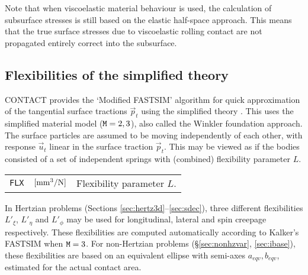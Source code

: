 \documentclass[12pt]{report}
\renewcommand{\magenta}[1]{}
\newenvironment{inputvars}{\vspace{0.4\baselineskip}%

\begin{tabular}{>{\raggedright}p{22mm}p{19mm}p{113mm}}}{
\end{tabular}

}
\newcommand{\inpvar}[3]{{\small\tt #1} & $#2$ & #3 \\[1ex]}
\begin{document}
Note that when viscoelastic material behaviour is used, the calculation of
subsurface stresses is still based on the elastic half-space approach. This
means that the true surface stresses due to viscoelastic rolling contact
are not propagated entirely correct into the subsurface.

\magenta{
\subsection{\texorpdfstring{\magenta{Compressible elastic layer}}{Compressible elastic layer}}
\label{sec:thin_sheet}

A quick fix is made to capture the effect of a sheet of pressure sensitive
paper, using the normal part of Kalker's first order theory \cite[\S
3.2]{Kalker1990}:
\begin{equation}
     u_z^{(3)} = L_z p_n, \;\; 
     L_z = h^{(3)} \frac{(1+\nu^{(3)}) (1-2\nu^{(3)})}{(1-\nu^{(3)}) E^{(3)}} .
\end{equation} 
\begin{inputvars}
\inpvar{FLXZ}{\bunit{mm^3/N}}{Flexibility parameter $L_z$.}
\end{inputvars}
This option is activated with ${\tt B}=1$ (page \pageref{b-digit}).
}

\subsection{Flexibilities of the simplified theory}
\label{sec:fastsim}

CONTACT provides the `Modified FASTSIM' algorithm \cite{Spiryagin2013} for
quick approximation of the tangential surface tractions $\vec{p}_t$ using
the simplified theory \cite{Kalker1973,Kalker1982a-fastsim}. This uses the
simplified material model (${\tt M}=2,3$), also called the Winkler
foundation approach. The surface particles are assumed to be moving
independently of each other, with response $\vec{u}_t$ linear in the
surface traction $\vec{p}_t$. This may be viewed as if the bodies
consisted of a set of independent springs with (combined) flexibility
parameter $L$.
\begin{inputvars}
\inpvar{FLX}{\bunit{mm^3/N}}{Flexibility parameter $L$.}
\end{inputvars}
In Hertzian problems (Sections \ref{sec:hertz3d}--\ref{sec:sdec}),
three different flexibilities $L'_\xi$, $L'_\eta$ and $L'_\phi$ may be
used for longitudinal, lateral and spin creepage respectively. These
flexibilities are computed automatically according to Kalker's
FASTSIM when ${\tt M}=3$. For non-Hertzian problems (\S \ref{sec:nonhzvar}, 
\ref{sec:ibase}), these flexibilities are based on an equivalent ellipse
with semi-axes $a_{eqv}, b_{eqv}$, estimated for the actual contact area.
\end{document}
